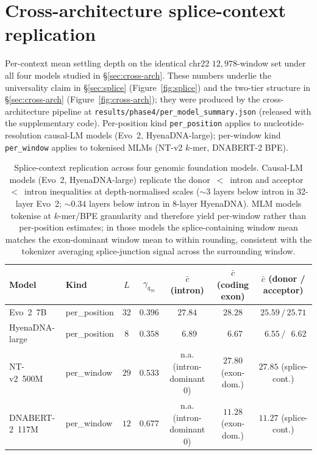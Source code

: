 \documentclass[12pt]{article}
\theoremstyle{plain}
\theoremstyle{definition}
\theoremstyle{remark}
\begin{document}
\section{Cross-architecture splice-context replication}
\label{app:cross-arch}

Per-context mean settling depth on the identical chr22
$12{,}978$-window set under all four models studied in
\S\ref{sec:cross-arch}. These numbers underlie the universality claim
in \S\ref{sec:splice} (Figure~\ref{fig:splice}) and the two-tier
structure in \S\ref{sec:cross-arch} (Figure~\ref{fig:cross-arch}); they
were produced by the cross-architecture pipeline at
\texttt{results/phase4/per\_model\_summary.json} (released with the
supplementary code). Per-position kind \texttt{per\_position} applies
to nucleotide-resolution causal-LM models (Evo~2, HyenaDNA-large);
per-window kind \texttt{per\_window} applies to tokenised MLMs
(NT-v2 $k$-mer, DNABERT-2 BPE).

\begin{table}[h]
\caption{Splice-context replication across four genomic foundation
models. Causal-LM models (Evo~2, HyenaDNA-large) replicate the
donor~$<$~intron and acceptor~$<$~intron inequalities at
depth-normalised scales ($\sim 3$ layers below intron in 32-layer
Evo~2; $\sim 0.34$ layers below intron in 8-layer HyenaDNA). MLM
models tokenise at $k$-mer/BPE granularity and therefore yield
per-window rather than per-position estimates; in those models the
splice-containing window mean matches the exon-dominant window mean to
within rounding, consistent with the tokenizer averaging splice-junction
signal across the surrounding window.}
\label{tab:cross-arch-context}
\centering
\footnotesize
\setlength{\tabcolsep}{4pt}
\begin{tabular}{@{}llccccc@{}}
\toprule
Model & Kind & $L$ & $\gamma_{q_{70}}$
   & $\bar c$ (intron) & $\bar c$ (coding exon)
   & $\bar c$ (donor / acceptor) \\
\midrule
Evo~2~7B            & per\_position & $32$ & $0.396$
   & $27.84$ & $28.28$ & $25.59 \,/\, 25.71$ \\
HyenaDNA-large      & per\_position & $8$  & $0.358$
   & $\phantom{0}6.89$ & $\phantom{0}6.67$
   & $\phantom{0}6.55 \,/\, \phantom{0}6.62$ \\
NT-v2~500M          & per\_window   & $29$ & $0.533$
   & n.a. (intron-dominant 0)
   & $27.80$ (exon-dom.) & $27.85$ (splice-cont.) \\
DNABERT-2~117M      & per\_window   & $12$ & $0.677$
   & n.a. (intron-dominant 0)
   & $11.28$ (exon-dom.) & $11.27$ (splice-cont.) \\
\bottomrule
\end{tabular}
\end{table}
\end{document}
